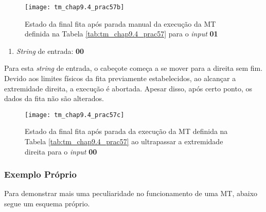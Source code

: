 \begin{figure}[H]
    \centering
    \texttt{[image: tm\_chap9.4\_prac57b]}
    \caption{
        Estado da final fita após parada manual da execução da MT definida na
        Tabela \ref{tab:tm_chap9.4_prac57} para o \textit{input} \textbf{01}
    }
    \label{fig:tm_chap9.4_prac57b}
\end{figure}

\begin{enumerate}[resume*]
    \item \textit{String} de entrada: \textbf{00}
\end{enumerate}

Para esta \textit{string} de entrada, o cabeçote começa a se mover para a
direita sem fim. Devido aos limites físicos da fita previamente estabelecidos,
ao alcançar a extremidade direita, a execução é abortada. Apesar disso, após
certo ponto, os dados da fita não são alterados.

\begin{figure}[H]
    \centering
    \texttt{[image: tm\_chap9.4\_prac57c]}
    \caption{
        Estado da final fita após parada da execução da MT definida na
        Tabela \ref{tab:tm_chap9.4_prac57} ao ultrapassar a extremidade direita
        para o \textit{input} \textbf{00}
    }
    \label{fig:tm_chap9.4_prac57c}
\end{figure}

\subsubsection*{Exemplo Próprio}

Para demonstrar mais uma peculiaridade no funcionamento de uma MT, abaixo segue
um esquema próprio.

